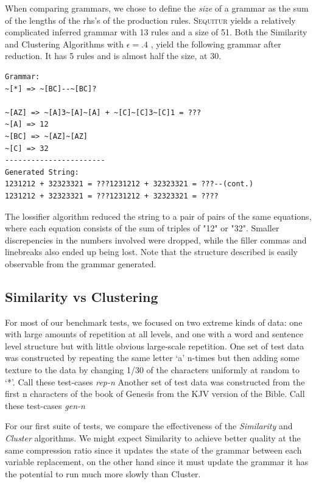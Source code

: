 \documentclass[11pt]{article}
\newcommand{\Sequitur}{\textsc{Sequitur}\xspace}
\begin{document}
When comparing grammars, we chose to define the \emph{size} of a grammar as the
sum of the lengths of the rhs's of the production rules.  \Sequitur yields a
relatively complicated inferred grammar with 13 rules and a size of 51. Both
the Similarity and Clustering Algorithms with $\epsilon = .4$ , yield the
following grammar after reduction. It has 5 rules and is almost half the size,
at 30.

\begin{verbatim}
Grammar:
~[*] => ~[BC]--~[BC]?

~[AZ] => ~[A]3~[A]~[A] + ~[C]~[C]3~[C]1 = ???
~[A] => 12
~[BC] => ~[AZ]~[AZ]
~[C] => 32
-----------------------
Generated String:
1231212 + 32323321 = ???1231212 + 32323321 = ???--(cont.)
1231212 + 32323321 = ???1231212 + 32323321 = ????
\end{verbatim}

The lossifier algorithm reduced the string to a pair of pairs of the same
equations, where each equation consists of the sum of triples of "12" or "32".
Smaller discrepencies in the numbers involved were dropped, while the filler
commas and linebreaks also ended up being lost. Note that the structure
described is easily observable from the grammar generated.

\subsection{Similarity vs Clustering}

For most of our benchmark tests, we focused on two extreme kinds of data: one
with large amounts of repetition at all levels, and one with a word and
sentence level structure but with little obvious large-scale repetition.  One
set of test data was constructed by repeating the same letter `a' n-times but
then adding some texture to the data by changing 1/30 of the characters
uniformly at random to `*'. Call these test-cases \emph{rep-n} Another set of
test data was constructed from the first n characters of the book of Genesis
from the KJV version of the Bible.  Call these test-cases \emph{gen-n}

For our first suite of tests, we compare the effectiveness of the
\emph{Similarity} and \emph{Cluster} algorithms. We might expect Similarity to
achieve better quality at the same compression ratio since it updates the state
of the grammar between each variable replacement, on the other hand since it
must update the grammar it has the potential to run much more slowly than
Cluster.
\end{document}
